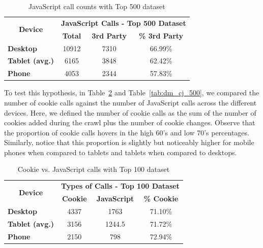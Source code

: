 \documentclass{acm_proc_article-sp}
\begin{document}
\begin{table}[htbp]
  \centering
  \caption{JavaScript call counts with Top 500 dataset}
    \begin{tabular}{|c|c|c|c|}
    \hline
    \multicolumn{1}{|c|}{\multirow{2}[4]{*}{\textbf{Device}}} & \multicolumn{3}{|c|}{\textbf{JavaScript Calls - Top 500 Dataset}} \\ \cline{2-4}
    \multicolumn{1}{|c|}{} & \multicolumn{1}{|c|}{\textbf{Total}} & \multicolumn{1}{|c|}{\textbf{3rd Party}} & \multicolumn{1}{|c|}{\textbf{\% 3rd Party}} \\ \hline
    \multicolumn{1}{|l|}{\textbf{Desktop}} & 10912   & 7310  & 66.99\% \\
    \multicolumn{1}{|l|}{\textbf{Tablet (avg.)}} & 6165   & 3848  & 62.42\% \\
    \multicolumn{1}{|l|}{\textbf{Phone}} & 4053  & 2344 & 57.83\%\\ \hline
    \end{tabular}%
  \label{tab:dm_javascript_500}%
\end{table}%

To test this hypothesis, in Table~\ref{tab:dm_cj_100} and Table~\ref{tab:dm_cj_500}, we compared the number of cookie calls against the number of JavaScript calls across the different devices. Here, we defined the number of cookie calls as the sum of the number of cookies added during the crawl plus the number of cookie changes. Observe that the proportion of cookie calls hovers in the high 60's and low 70's percentages. Similarly, notice that this proportion is slightly but noticeably higher for mobile phones when compared to tablets and tablets when compared to desktops.


\begin{table}[h]
  \centering
  \caption{Cookie vs. JavaScript calls with Top 100 dataset}
    \begin{tabular}{|c|c|c|c|}
    \hline
    \multicolumn{1}{|c|}{\multirow{2}[4]{*}{\textbf{Device}}} & \multicolumn{3}{|c|}{\textbf{Types of Calls - Top 100 Dataset}} \\ \cline{2-4}
    \multicolumn{1}{|c|}{} & \multicolumn{1}{|c|}{\textbf{Cookie}} & \multicolumn{1}{|c|}{\textbf{JavaScript}} & \multicolumn{1}{|c|}{\textbf{\% Cookie}}  \\ \hline
    \multicolumn{1}{|l|}{\textbf{Desktop}} & 4337  & 1763  & 71.10\% \\
    \multicolumn{1}{|l|}{\textbf{Tablet (avg.)}} & 3156   & 1244.5 & 71.72\%  \\
    \multicolumn{1}{|l|}{\textbf{Phone}} & 2150  & 798  & 72.94\% \\ \hline
    \end{tabular}%
  \label{tab:dm_cj_100}%
\end{table}%
\end{document}
